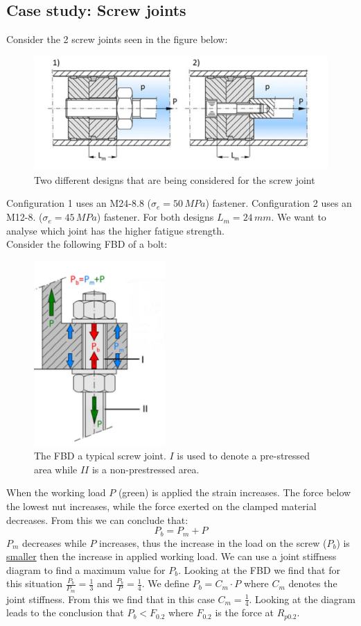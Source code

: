 \documentclass[11pt, a4paper]{article}
\begin{document}
\subsection{Case study: Screw joints}
Consider the 2 screw joints seen in the figure below:
\begin{figure}[H]
  \centerline{\includegraphics[width=120mm]{images/Bolt_2.png}}
  \caption{Two different designs that are being considered for the screw joint}
\end{figure}
Configuration 1 uses an M24-8.8 ($\sigma_e = 50\,MPa$) fastener. Configuration 2 uses an M12-8. ($\sigma_e = 45\,MPa$) fastener. For both designs $L_m=24\,mm$. We want to analyse which joint has the higher fatigue strength.\\
Consider the following FBD of a bolt:
\begin{figure}[h]
  \centerline{\includegraphics[width=50mm]{images/FBD.png}}
  \caption{The FBD a typical screw joint. $I$ is used to denote a pre-stressed area while $II$ is a non-prestressed area.}
\end{figure}
When the working load $P$ (green) is applied the strain increases. The force below the lowest nut increases, while the force exerted on the clamped material decreases. From this we can conclude that:
\begin{equation}
  P_b = P_m + P
\end{equation}
$P_m$ decreases while $P$ increases, thus the increase in the load on the screw ($P_b$) is \underline{smaller} then the increase in applied working load. We can use a joint stiffness diagram to find a maximum value for $P_b$. Looking at the FBD we find that for this situation $\frac{P_b}{P_m} = \frac{1}{3}$ and $\frac{P_b}{P} = \frac{1}{4}$. We define $P_b = C_m\cdot P$ where $C_m$ denotes the joint stiffness. From this we find that in this case $C_m = \frac{1}{4}$. Looking at the diagram leads to the conclusion that $P_b < F_{0.2}$ where $F_{0.2}$ is the force at $R_{p0.2}$.
\end{document}
